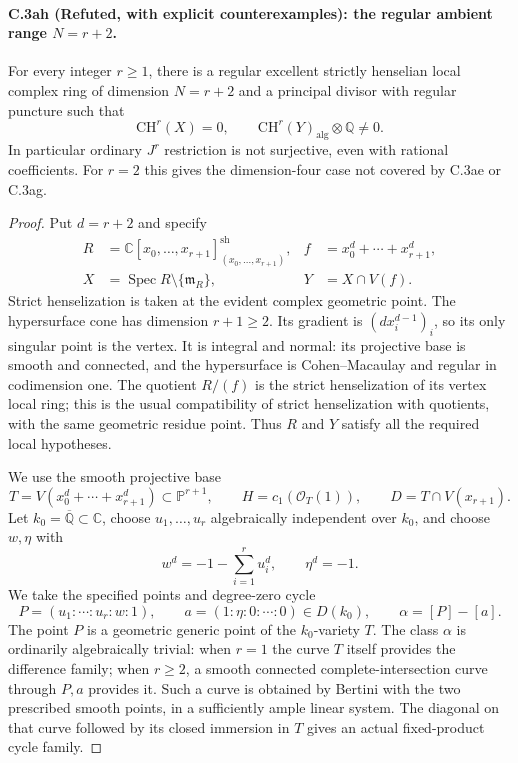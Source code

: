 \paragraph{C.3ah (Refuted, with explicit counterexamples): the regular ambient range $N=r+2$.}
For every integer $r\ge1$, there is a regular excellent strictly
henselian local complex ring of dimension $N=r+2$ and a principal
divisor with regular puncture such that
\[
 \mathrm{CH}^r(X)=0,
 \qquad
 \mathrm{CH}^r(Y)_{\mathrm{alg}}\otimes\mathbb Q\ne0.
\]
In particular ordinary $J^r$ restriction is not surjective,
even with rational coefficients. For $r=2$ this gives the
dimension-four case not covered by C.3ae or C.3ag.

\begin{proof}
Put $d=r+2$ and specify
\[
 \begin{aligned}
 R&=\mathbb C[x_0,\ldots,x_{r+1}]_{(x_0,\ldots,x_{r+1})}^{\mathrm{sh}},
 & f&=x_0^d+\cdots+x_{r+1}^d,\\
 X&=\operatorname{Spec}R\setminus\{\mathfrak m_R\},
 &Y&=X\cap V(f).
 \end{aligned}
\]
Strict henselization is taken at the evident complex geometric
point. The hypersurface cone has dimension $r+1\ge2$.
Its gradient is $(d x_i^{d-1})_i$, so its only singular point
is the vertex. It is integral and normal: its projective
base is smooth and connected, and the hypersurface is
Cohen--Macaulay and regular in codimension one. The quotient
$R/(f)$ is the strict henselization of its vertex local ring;
this is the usual compatibility of strict henselization with
quotients, with the same geometric residue point. Thus $R$
and $Y$ satisfy all the required local hypotheses.

We use the smooth projective base
\[
 T=V(x_0^d+\cdots+x_{r+1}^d)\subset\mathbb P^{r+1},
 \qquad H=c_1(\mathcal O_T(1)),
 \qquad D=T\cap V(x_{r+1}).
\]
Let $k_0=\overline{\mathbb Q}\subset\mathbb C$, choose
$u_1,\ldots,u_r$ algebraically independent over $k_0$, and choose
$w,\eta$ with
\[
 w^d=-1-\sum_{i=1}^r u_i^d,
 \qquad \eta^d=-1.
\]
We take the specified points and degree-zero cycle
\[
 P=(u_1:\cdots:u_r:w:1),\qquad
 a=(1:\eta:0:\cdots:0)\in D(k_0),\qquad
 \alpha=[P]-[a].
\]
The point $P$ is a geometric generic point of the
$k_0$-variety $T$. The class $\alpha$ is ordinarily
algebraically trivial: when $r=1$ the curve $T$ itself
provides the difference family; when $r\ge2$, a smooth
connected complete-intersection curve through $P,a$
provides it. Such a curve is obtained by Bertini with the
two prescribed smooth points, in a sufficiently ample
linear system. The diagonal on that curve followed by its
closed immersion in $T$ gives an actual fixed-product
cycle family.


\end{proof}
